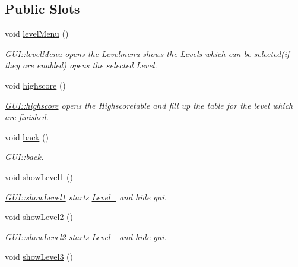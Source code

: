 \subsection*{Public Slots}
\begin{DoxyCompactItemize}
\item 
void \hyperlink{class_g_u_i_a9db2dc23fdc3aae57f9aaca530406365}{level\+Menu} ()
\begin{DoxyCompactList}\small\item\em \hyperlink{class_g_u_i_a9db2dc23fdc3aae57f9aaca530406365}{G\+U\+I\+::level\+Menu} opens the Levelmenu shows the Levels which can be selected(if they are enabled) opens the selected Level. \end{DoxyCompactList}\item 
void \hyperlink{class_g_u_i_a762402ea37d943ce0e94735895938117}{highscore} ()
\begin{DoxyCompactList}\small\item\em \hyperlink{class_g_u_i_a762402ea37d943ce0e94735895938117}{G\+U\+I\+::highscore} opens the Highscoretable and fill up the table for the level which are finished. \end{DoxyCompactList}\item 
void \hyperlink{class_g_u_i_aac5b92fad527c99c5aa84ed7fba970e3}{back} ()
\begin{DoxyCompactList}\small\item\em \hyperlink{class_g_u_i_aac5b92fad527c99c5aa84ed7fba970e3}{G\+U\+I\+::back}. \end{DoxyCompactList}\item 
void \hyperlink{class_g_u_i_a8de8197be4973e551cc0bc700f8112b3}{show\+Level1} ()
\begin{DoxyCompactList}\small\item\em \hyperlink{class_g_u_i_a8de8197be4973e551cc0bc700f8112b3}{G\+U\+I\+::show\+Level1} starts \hyperlink{class_level__1}{Level\+\_} and hide gui. \end{DoxyCompactList}\item 
void \hyperlink{class_g_u_i_a5d12a36d8c4c0f9675054188ab6a4717}{show\+Level2} ()
\begin{DoxyCompactList}\small\item\em \hyperlink{class_g_u_i_a5d12a36d8c4c0f9675054188ab6a4717}{G\+U\+I\+::show\+Level2} starts \hyperlink{class_level__2}{Level\+\_} and hide gui. \end{DoxyCompactList}\item 
void \hyperlink{class_g_u_i_ae93c49b9edadf4549bdac5caa3be5f2e}{show\+Level3} ()

\end{DoxyCompactItemize}
